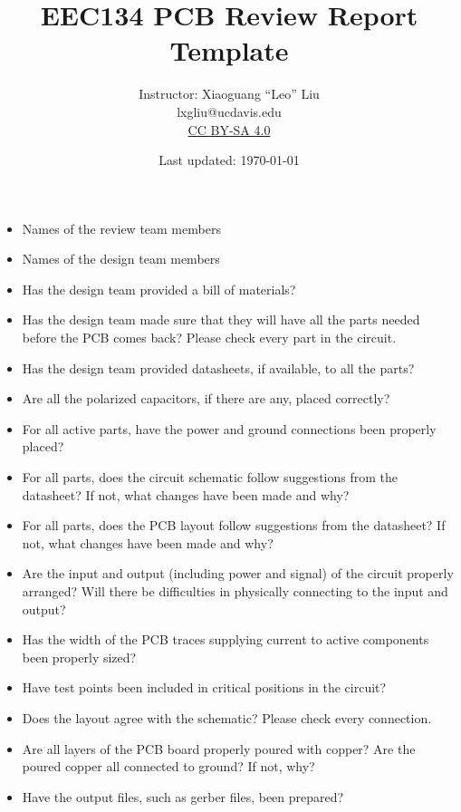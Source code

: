 \documentclass[letterpaper, 11pt]{article}
\title{EEC134 PCB Review Report Template}
\author{Instructor: Xiaoguang ``Leo'' Liu \\ lxgliu@ucdavis.edu \\ \small \href{http://creativecommons.org/licenses/by-sa/4.0/}{CC BY-SA 4.0}}
\date{Last updated: \today}
\begin{document}
\maketitle

\begin{itemize}[itemsep=3ex]

	\item Names of the review team members

	\item Names of the design team members

	\item Has the design team provided a bill of materials?

	\item Has the design team made sure that they will have all the parts needed before the PCB comes back? Please check every part in the circuit. 

	\item Has the design team provided datasheets, if available, to all the parts?

	\item Are all the polarized capacitors, if there are any, placed correctly?

	\item For all active parts, have the power and ground connections been properly placed?

	\item For all parts, does the circuit schematic follow suggestions from the datasheet? If not, what changes have been made and why?

	\item For all parts, does the PCB layout follow suggestions from the datasheet? If not, what changes have been made and why?

	\item Are the input and output (including power and signal) of the circuit properly arranged? Will there be difficulties in physically connecting to the input and output?
	
	\item Has the width of the PCB traces supplying current to active components been properly sized?
	 
	\item Have test points been included in critical positions in the circuit?

	\item Does the layout agree with the schematic? Please check every connection. 

	\item Are all layers of the PCB board properly poured with copper? Are the poured copper all connected to ground? If not, why?

	\item Have the output files, such as gerber files, been prepared?

\end{itemize}
\end{document}
